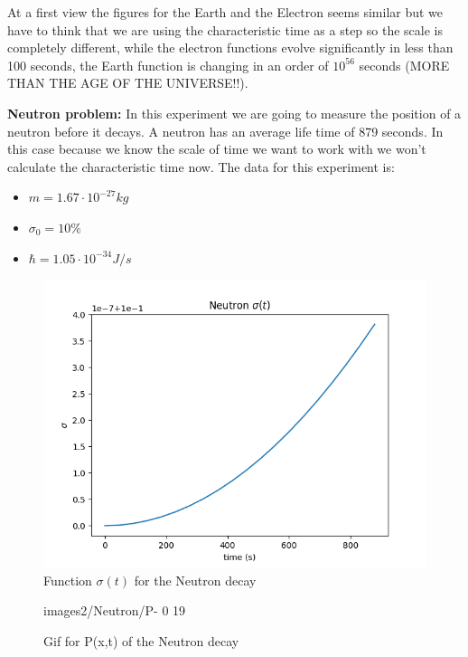 At a first view the figures for the Earth and the Electron seems similar but we have to think that we are using the characteristic time as a step so the scale is completely different, while the electron functions evolve significantly in less than 100 seconds, the Earth function is changing in an order of $10^{56}$ seconds (MORE THAN THE AGE OF THE UNIVERSE!!). 


\textbf{Neutron problem: } In this experiment we are going to measure the position of a neutron before it decays. A neutron has an average life time of 879 seconds. In this case because we know the scale of time we want to work with we won't calculate the characteristic time now. The data for this experiment is:


\begin{itemize}
    \item $m = 1.67 \cdot 10^{-27} kg$
    \item $ \sigma_0 = 10\% $
    \item $\hbar = 1.05 \cdot 10^{-34} J/s$
\end{itemize}

\begin{figure}[H]
    \centering
    \includegraphics{images2/Neutron/sigma.png}
    \caption{Function $\sigma(t)$ for the Neutron decay}
    \label{fig:sigma_neutron}
\end{figure}

\begin{figure}[H]
    \centering
    {images2/Neutron/P-}%
    {0}%
    {19}%
    \caption{Gif for P(x,t) of the Neutron decay}
    \label{P_neutron}
\end{figure}

